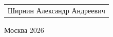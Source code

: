 \begin{titlepage}
{
\begin{tabular}{l}
Ширнин Александр Андреевич
\end{tabular}}



\vspace{\fill}

\begin{center}
Москва 2026
\end{center}

\end{titlepage}